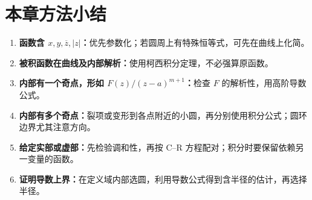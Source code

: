 \documentclass[UTF8,11pt,a4paper,fontset=fandol]{ctexart}
\begin{document}
\section*{本章方法小结}
\begin{enumerate}
\item \textbf{函数含 $x,y,\overline z,|z|$：}优先参数化；若圆周上有特殊恒等式，可先在曲线上化简。
\item \textbf{被积函数在曲线及内部解析：}使用柯西积分定理，不必强算原函数。
\item \textbf{内部有一个奇点，形如 $F(z)/(z-a)^{m+1}$：}检查 $F$ 的解析性，用高阶导数公式。
\item \textbf{内部有多个奇点：}裂项或变形到各点附近的小圆，再分别使用积分公式；圆环边界尤其注意方向。
\item \textbf{给定实部或虚部：}先检验调和性，再按 C--R 方程配对；积分时要保留依赖另一变量的函数。
\item \textbf{证明导数上界：}在定义域内部选圆，利用导数公式得到含半径的估计，再选择半径。
\end{enumerate}
\end{document}
